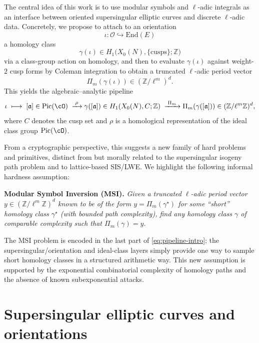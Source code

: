 \documentclass[10pt]{amsart}
\theoremstyle{theostyle}
\newcommand{\ZZ}{\mathbb{Z}}
\renewcommand{\fa}{\mathfrak{a}} \newcommand{\fb}{\mathfrak{b}} \newcommand{\fc}{\mathfrak{c}}
\newcommand{\End}{\mathrm{End}}
\newcommand{\Pic}{\mathrm{Pic}}
\begin{document}
The central idea of this work is to use modular symbols and $\ell$-adic integrals
as an interface between oriented supersingular elliptic curves and
discrete $\ell$-adic data. Concretely, we propose to attach to an orientation
\[
\iota : \mathcal O \hookrightarrow \End(E)
\]
a homology class 
\[
\gamma(\iota) \in H_1\bigl(X_0(N),\{\text{cusps}\};\ZZ\bigr)
\]
via a class-group action on homology, and then to evaluate $\gamma(\iota)$
against weight-$2$ cusp forms by Coleman integration to obtain a truncated
$\ell$-adic period vector
\[
\Pi_m(\gamma(\iota))
\in (\ZZ/\ell^m)^d.
\]
This yields the algebraic--analytic pipeline
\begin{equation} \label{eq:pipeline-intro}
\iota
\;\longmapsto\; [\fa] \in \Pic(\cO)
\;\xrightarrow{\;\rho\;}
\gamma([\fa]) \in H_1(X_0(N),C;\ZZ)
\;\xrightarrow{\;\Pi_m\;}
\Pi_m(\gamma([\fa])) \in (\ZZ/\ell^m\ZZ)^d,
\end{equation}
where $C$ denotes the cusp set and $\rho$ is a homological representation of
the ideal class group $\Pic(\cO)$.

From a cryptographic perspective, this suggests a new family of hard problems
and primitives, distinct from but morally related to the supersingular isogeny
path problem and to lattice-based SIS/LWE. We highlight the following informal hardness
assumption:

\medskip
\noindent\textbf{Modular Symbol Inversion (MSI).}
\emph{Given a truncated $\ell$-adic period vector $y \in (\ZZ/\ell^m\ZZ)^d$ known to be
of the form $y=\Pi_m(\gamma^\star)$ for some ``short'' homology class
$\gamma^\star$ (with bounded path complexity), find any homology class
$\gamma$ of comparable complexity such that $\Pi_m(\gamma)=y$.}

\medskip

The MSI problem is encoded in the last part of \eqref{eq:pipeline-intro};
the supersingular/orientation and ideal-class layers simply provide one
way to sample short homology classes in a structured arithmetic way.
This new assumption is supported by the exponential
combinatorial complexity of homology paths and the absence of known
subexponential attacks.


\section{Supersingular elliptic curves and orientations}\label{sec:supersingular-orient}
\end{document}
